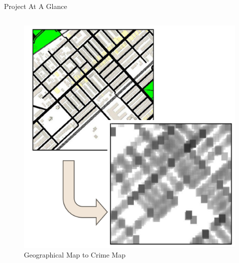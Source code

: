\documentclass{beamer}
\begin{document}
\begin{frame}{Project At A Glance}
\begin{columns}[T]
        \begin{column}{.5\textwidth}
            \begin{figure}
                \includegraphics[width=\textwidth]{Figures/Intro Figure.png} %
                \caption{Geographical Map to Crime Map}
            \end{figure}
        \end{column}

    \end{columns}

\end{frame}
\end{document}
